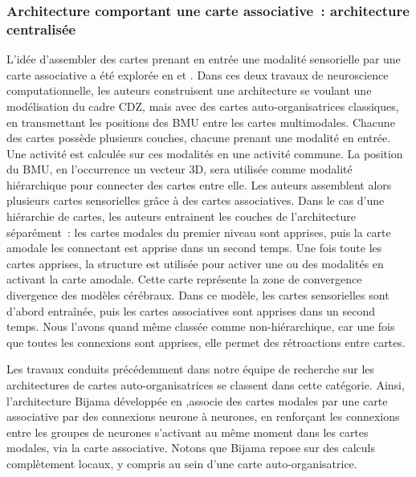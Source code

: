 \documentclass[../main]{subfiles}
\begin{document}
\subsubsection{Architecture comportant une carte associative~: architecture centralisée}

L'idée d'assembler des cartes prenant en entrée une modalité sensorielle par une carte associative a été explorée en \cite{dominey13} et \cite{escobar-juarez_self-organized_2016}.
Dans ces deux travaux de neuroscience computationnelle, les auteurs construisent une architecture se voulant une modélisation du cadre CDZ, mais avec des cartes auto-organisatrices classiques, en transmettant les positions des BMU entre les cartes multimodales. 
Chacune des cartes possède plusieurs couches, chacune prenant une modalité en entrée. Une activité est calculée sur ces modalités en une activité commune. La position du BMU, en l'occurrence un vecteur 3D, sera utilisée comme modalité hiérarchique pour connecter des cartes entre elle. Les auteurs assemblent alors plusieurs cartes sensorielles grâce à des cartes associatives.
Dans le cas d'une hiérarchie de cartes, les auteurs entrainent les couches de l'architecture séparément~: les cartes modales du premier niveau sont apprises, puis la carte amodale les connectant est apprise dans un second temps. 
Une fois toute les cartes apprises, la structure est utilisée pour activer une ou des modalités en activant la carte amodale. Cette carte représente la zone de convergence divergence des modèles cérébraux. 
Dans ce modèle, les cartes sensorielles sont d'abord entraînée, puis les cartes associatives sont apprises dans un second temps. Nous l'avons quand même classée comme non-hiérarchique, car une fois que toutes les connexions sont apprises, elle permet des rétroactions entre cartes. 

Les travaux conduits précédemment dans notre équipe de recherche sur les architectures de cartes auto-organisatrices se classent dans cette catégorie. Ainsi, l'architecture Bijama développée en \cite{menard05,khouzam_2013},associe des cartes modales par une carte associative par des connexions neurone à neurones, en renforçant les connexions entre les groupes de neurones s'activant au même moment dans les cartes modales, via la carte associative.
Notons que Bijama repose sur des calculs complètement locaux, y compris au sein d'une carte auto-organisatrice.
\end{document}

